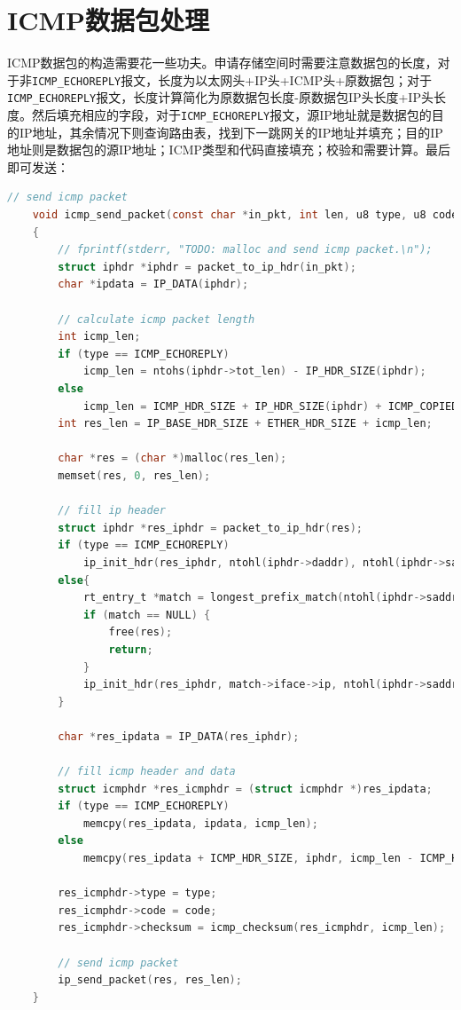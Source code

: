 \documentclass[UTF8]{report}
\begin{document}
\section{ICMP数据包处理}

ICMP数据包的构造需要花一些功夫。申请存储空间时需要注意数据包的长度，对于非\texttt{ICMP_ECHOREPLY}报文，长度为以太网头+IP头+ICMP头+原数据包；对于\texttt{ICMP_ECHOREPLY}报文，长度计算简化为原数据包长度-原数据包IP头长度+IP头长度。然后填充相应的字段，对于\texttt{ICMP_ECHOREPLY}报文，源IP地址就是数据包的目的IP地址，其余情况下则查询路由表，找到下一跳网关的IP地址并填充；目的IP地址则是数据包的源IP地址；ICMP类型和代码直接填充；校验和需要计算。最后即可发送：

\begin{lstlisting}[language=C]
    // send icmp packet
    void icmp_send_packet(const char *in_pkt, int len, u8 type, u8 code)
    {
        // fprintf(stderr, "TODO: malloc and send icmp packet.\n");
        struct iphdr *iphdr = packet_to_ip_hdr(in_pkt);
        char *ipdata = IP_DATA(iphdr);
    
        // calculate icmp packet length
        int icmp_len;
        if (type == ICMP_ECHOREPLY)
            icmp_len = ntohs(iphdr->tot_len) - IP_HDR_SIZE(iphdr);
        else
            icmp_len = ICMP_HDR_SIZE + IP_HDR_SIZE(iphdr) + ICMP_COPIED_DATA_LEN;
        int res_len = IP_BASE_HDR_SIZE + ETHER_HDR_SIZE + icmp_len;
    
        char *res = (char *)malloc(res_len);
        memset(res, 0, res_len);
    
        // fill ip header
        struct iphdr *res_iphdr = packet_to_ip_hdr(res);
        if (type == ICMP_ECHOREPLY)
            ip_init_hdr(res_iphdr, ntohl(iphdr->daddr), ntohl(iphdr->saddr), icmp_len + IP_BASE_HDR_SIZE, IPPROTO_ICMP);
        else{
            rt_entry_t *match = longest_prefix_match(ntohl(iphdr->saddr));
            if (match == NULL) {
                free(res);
                return;
            }
            ip_init_hdr(res_iphdr, match->iface->ip, ntohl(iphdr->saddr), icmp_len + IP_BASE_HDR_SIZE, IPPROTO_ICMP);
        }
    
        char *res_ipdata = IP_DATA(res_iphdr);
    
        // fill icmp header and data
        struct icmphdr *res_icmphdr = (struct icmphdr *)res_ipdata;
        if (type == ICMP_ECHOREPLY)
            memcpy(res_ipdata, ipdata, icmp_len);
        else
            memcpy(res_ipdata + ICMP_HDR_SIZE, iphdr, icmp_len - ICMP_HDR_SIZE);
    
        res_icmphdr->type = type;
        res_icmphdr->code = code;
        res_icmphdr->checksum = icmp_checksum(res_icmphdr, icmp_len);
    
        // send icmp packet
        ip_send_packet(res, res_len);
    }
\end{lstlisting}
\end{document}
